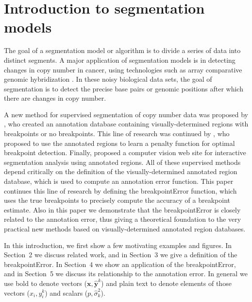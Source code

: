 \documentclass{jsfds} %
\begin{document}
  \begin{AMSclass}
  \end{AMSclass}
 
\newpage

\section{Introduction to segmentation models}

The goal of a segmentation model or algorithm is to divide a series of
data into distinct segments. A major application of segmentation
models is in detecting changes in copy number in cancer, using
technologies such as array comparative genomic hybridization
\citep{PSS98}. In these noisy biological data sets, the goal of
segmentation is to detect the precise base pairs or genomic positions after
which there are changes in copy number.

A new method for supervised segmentation of copy number data was
proposed by \citet{HOCKING-breakpoints}, who created an annotation
database containing visually-determined regions with breakpoints or no
breakpoints. This line of research was continued by
\citet{HOCKING-penalties}, who proposed to use the annotated regions
to learn a penalty function for optimal breakpoint detection. Finally,
\citet{SegAnnDB} proposed a computer vision web site for interactive
segmentation analysis using annotated regions. All of these supervised
methods depend critically on the definition of the visually-determined
annotated region database, which is used to compute an annotation
error function. This paper continues this line of research by defining
the breakpointError function, which uses the true breakpoints to
precisely compute the accuracy of a breakpoint estimate. Also in this
paper we demonstrate that the breakpointError is closely related to
the annotation error, thus giving a theoretical foundation to the very
practical new methods based on visually-determined annotated region
databases.

In this introduction, we first show a few motivating examples and
figures. In Section~2 we discuss related work, and in Section~3 we
give a definition of the breakpointError. In Section~4 we show an
application of the breakpointError, and in Section~5 we discuss its
relationship to the annotation error. In general we use bold to denote
vectors ($\mathbf x, \mathbf{\hat y}^k$) and plain text to denote
elements of those vectors ($x_i, y_i^k$) and scalars ($p, \hat
\sigma^2_k$).
\end{document}
